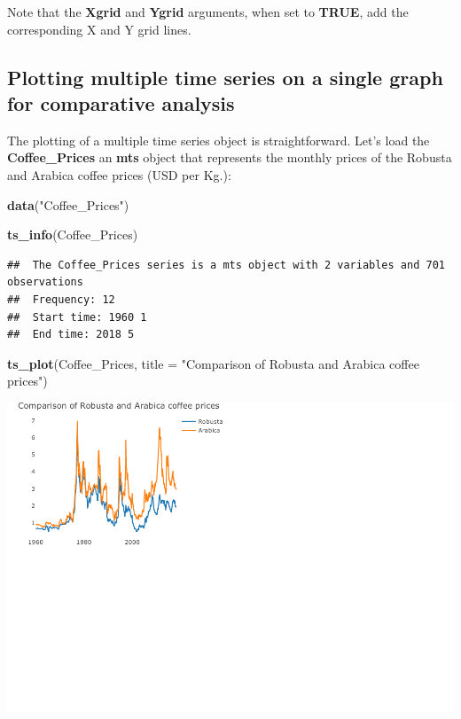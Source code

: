 \documentclass[
]{book}
\newenvironment{Shaded}{\begin{snugshade}}{\end{snugshade}}
\newcommand{\AttributeTok}[1]{\textcolor[rgb]{0.13,0.29,0.53}{#1}}
\newcommand{\FunctionTok}[1]{\textcolor[rgb]{0.13,0.29,0.53}{\textbf{#1}}}
\newcommand{\NormalTok}[1]{#1}
\newcommand{\StringTok}[1]{\textcolor[rgb]{0.31,0.60,0.02}{#1}}
\begin{document}
Note that the \textbf{Xgrid} and \textbf{Ygrid} arguments, when set to \textbf{TRUE}, add the corresponding X and Y grid lines.

\subsection{Plotting multiple time series on a single graph for comparative analysis}\label{plotting-multiple-time-series-on-a-single-graph-for-comparative-analysis}

The plotting of a multiple time series object is straightforward. Let's load the \textbf{Coffee\_Prices} an \textbf{mts} object that represents the monthly prices of the Robusta and Arabica coffee prices (USD per Kg.):

\begin{Shaded}
\begin{Highlighting}[]
\FunctionTok{data}\NormalTok{(}\StringTok{"Coffee\_Prices"}\NormalTok{)}

\FunctionTok{ts\_info}\NormalTok{(Coffee\_Prices)}
\end{Highlighting}
\end{Shaded}

\begin{verbatim}
##  The Coffee_Prices series is a mts object with 2 variables and 701 observations
##  Frequency: 12 
##  Start time: 1960 1 
##  End time: 2018 5
\end{verbatim}

\begin{Shaded}
\begin{Highlighting}[]
\FunctionTok{ts\_plot}\NormalTok{(Coffee\_Prices,}
        \AttributeTok{title =} \StringTok{"Comparison of Robusta and Arabica coffee prices"}\NormalTok{)}
\end{Highlighting}
\end{Shaded}

\includegraphics{_main_files/figure-latex/unnamed-chunk-64-1.pdf}
\end{document}
